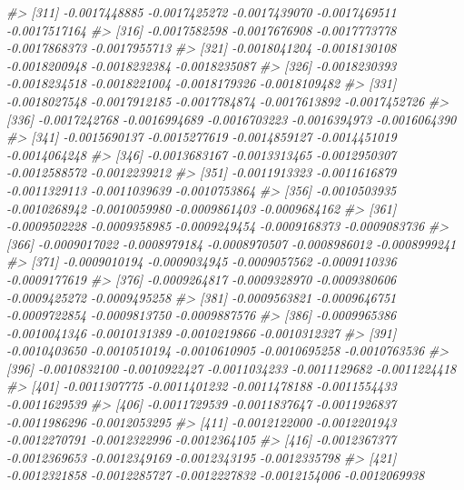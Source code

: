 \documentclass[
]{article}
\newenvironment{Shaded}{\begin{snugshade}}{\end{snugshade}}
\newcommand{\CommentTok}[1]{\textcolor[rgb]{0.56,0.35,0.01}{\textit{#1}}}
\begin{document}
\begin{Shaded}
\begin{Highlighting}[]
\CommentTok{\#\textgreater{} [311] {-}0.0017448885 {-}0.0017425272 {-}0.0017439070 {-}0.0017469511 {-}0.0017517164}
\CommentTok{\#\textgreater{} [316] {-}0.0017582598 {-}0.0017676908 {-}0.0017773778 {-}0.0017868373 {-}0.0017955713}
\CommentTok{\#\textgreater{} [321] {-}0.0018041204 {-}0.0018130108 {-}0.0018200948 {-}0.0018232384 {-}0.0018235087}
\CommentTok{\#\textgreater{} [326] {-}0.0018230393 {-}0.0018234518 {-}0.0018221004 {-}0.0018179326 {-}0.0018109482}
\CommentTok{\#\textgreater{} [331] {-}0.0018027548 {-}0.0017912185 {-}0.0017784874 {-}0.0017613892 {-}0.0017452726}
\CommentTok{\#\textgreater{} [336] {-}0.0017242768 {-}0.0016994689 {-}0.0016703223 {-}0.0016394973 {-}0.0016064390}
\CommentTok{\#\textgreater{} [341] {-}0.0015690137 {-}0.0015277619 {-}0.0014859127 {-}0.0014451019 {-}0.0014064248}
\CommentTok{\#\textgreater{} [346] {-}0.0013683167 {-}0.0013313465 {-}0.0012950307 {-}0.0012588572 {-}0.0012239212}
\CommentTok{\#\textgreater{} [351] {-}0.0011913323 {-}0.0011616879 {-}0.0011329113 {-}0.0011039639 {-}0.0010753864}
\CommentTok{\#\textgreater{} [356] {-}0.0010503935 {-}0.0010268942 {-}0.0010059980 {-}0.0009861403 {-}0.0009684162}
\CommentTok{\#\textgreater{} [361] {-}0.0009502228 {-}0.0009358985 {-}0.0009249454 {-}0.0009168373 {-}0.0009083736}
\CommentTok{\#\textgreater{} [366] {-}0.0009017022 {-}0.0008979184 {-}0.0008970507 {-}0.0008986012 {-}0.0008999241}
\CommentTok{\#\textgreater{} [371] {-}0.0009010194 {-}0.0009034945 {-}0.0009057562 {-}0.0009110336 {-}0.0009177619}
\CommentTok{\#\textgreater{} [376] {-}0.0009264817 {-}0.0009328970 {-}0.0009380606 {-}0.0009425272 {-}0.0009495258}
\CommentTok{\#\textgreater{} [381] {-}0.0009563821 {-}0.0009646751 {-}0.0009722854 {-}0.0009813750 {-}0.0009887576}
\CommentTok{\#\textgreater{} [386] {-}0.0009965386 {-}0.0010041346 {-}0.0010131389 {-}0.0010219866 {-}0.0010312327}
\CommentTok{\#\textgreater{} [391] {-}0.0010403650 {-}0.0010510194 {-}0.0010610905 {-}0.0010695258 {-}0.0010763536}
\CommentTok{\#\textgreater{} [396] {-}0.0010832100 {-}0.0010922427 {-}0.0011034233 {-}0.0011129682 {-}0.0011224418}
\CommentTok{\#\textgreater{} [401] {-}0.0011307775 {-}0.0011401232 {-}0.0011478188 {-}0.0011554433 {-}0.0011629539}
\CommentTok{\#\textgreater{} [406] {-}0.0011729539 {-}0.0011837647 {-}0.0011926837 {-}0.0011986296 {-}0.0012053295}
\CommentTok{\#\textgreater{} [411] {-}0.0012122000 {-}0.0012201943 {-}0.0012270791 {-}0.0012322996 {-}0.0012364105}
\CommentTok{\#\textgreater{} [416] {-}0.0012367377 {-}0.0012369653 {-}0.0012349169 {-}0.0012343195 {-}0.0012335798}
\CommentTok{\#\textgreater{} [421] {-}0.0012321858 {-}0.0012285727 {-}0.0012227832 {-}0.0012154006 {-}0.0012069938}

\end{Highlighting}
\end{Shaded}
\end{document}
